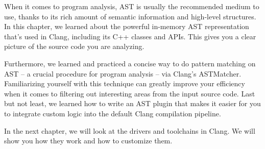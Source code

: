 When it comes to program analysis, AST is usually the recommended medium to use, thanks to its rich amount of semantic information and high-level structures. In this chapter, we learned about the powerful in-memory AST representation that's used in Clang, including its C++ classes and APIs. This gives you a clear picture of the source code you are analyzing.

Furthermore, we learned and practiced a concise way to do pattern matching on AST – a crucial procedure for program analysis – via Clang's ASTMatcher. Familiarizing yourself with this technique can greatly improve your efficiency when it comes to filtering out interesting areas from the input source code. Last but not least, we learned how to write an AST plugin that makes it easier for you to integrate custom logic into the default Clang compilation pipeline.

In the next chapter, we will look at the drivers and toolchains in Clang. We will show you how they work and how to customize them.